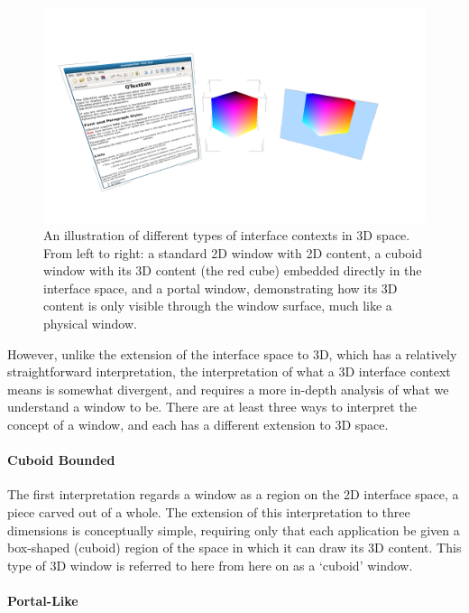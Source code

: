 \begin{figure}[ht!]
\centering
\includegraphics[width=1.0\textwidth]{images/window-types.png}
\caption{An illustration of different types of interface contexts in 3D space. From left to right: a standard 2D window with 2D content, a cuboid window with its 3D content (the red cube) embedded directly in the interface space, and a portal window, demonstrating how its 3D content is only visible through the window surface, much like a physical window.}
\end{figure}

However, unlike the extension of the interface space to 3D, which has a relatively straightforward interpretation, the interpretation of what a 3D interface context means is somewhat divergent, and requires a more in-depth analysis of what we understand a window to be. There are at least three ways to interpret the concept of a window, and each has a different extension to 3D space.

\paragraph{Cuboid Bounded}

The first interpretation regards a window as a region on the 2D interface space, a piece carved out of a whole. The extension of this interpretation to three dimensions is conceptually simple, requiring only that each application be given a box-shaped (cuboid) region of the space in which it can draw its 3D content. This type of 3D window is referred to here from here on as a `cuboid' window.

\paragraph{Portal-Like}

